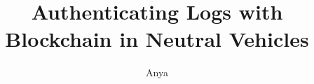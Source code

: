 \documentclass[defaultstyle,11pt]{thesis}
\title{Authenticating Logs with Blockchain in Neutral Vehicles}
\author{Anya}{Owsenek}
\begin{document}





%

%

\nocite{*}		%

%
%
\end{document}
